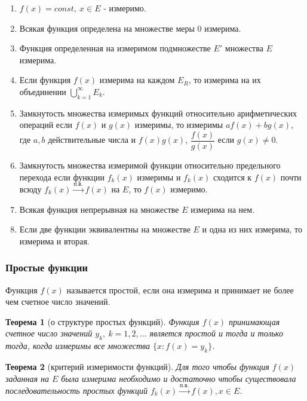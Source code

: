 \documentclass[14pt,a4paper]{extarticle}
\newtheorem{theorem}{Теорема}[section]
\theoremstyle{definition}
\theoremstyle{remark}
\renewcommand{\[}{\begin{dmath*}[compact]}
\renewcommand{\]}{\end{dmath*}}
\newcommand{\be}{\begin{enumerate}}
\newcommand{\ee}{\end{enumerate}}
\newcommand{\ds}{\displaystyle}
\newcommand{\sep}{ , \ \allowbreak }
\newcommand\fr[2]{\dfrac{#1}{#2}}
\begin{document}
\be
  \item $f(x)=const \sep x \in E$ - измеримо.

  \item Всякая функция определена на множестве меры 0 измерима.

  \item Функция определенная на измеримом подмножестве $E'$ множества
  $E$ измерима.

  \item Если функция $f(x)$ измерима на каждом $E_R$, то измерима на их
  объединении $\ds\bigcup _ {k=1}^\infty E_k$.

  \item Замкнутость множества измеримых функций относительно арифметических
  операций если $f(x)$ и $g(x)$ измеримы, то измеримы $af(x)+ bg(x)$, где $a,b$
  действительные числа и $f(x)g(x)$, $\fr{f(x)}{g(x)}$ если $g(x) \neq 0$.

  \item Замкнутость множества измеримой функции относительно предельного
  перехода если функции $f_k(x)$ измеримы и $f_k(x)$ сходится к $f(x)$
  почти всюду $f_k(x) \xrightarrow{\text{п.в.}} f(x)$ на $E$,
  то $f(x)$ измеримо.

  \item Всякая функция непрерывная на множестве $E$ измерима на нем.

  \item Если две функции эквивалентны на множестве $E$ и одна из них измерима,
  то измерима и вторая.
\ee

\subsubsection{Простые функции}

Функция $f(x)$ называется простой, если она измерима и принимает
не более чем счетное число значений.

\begin{theorem}[о структуре простых функций]
  Функция $f(x)$ принимающая счетное число значений $y_k\sep k=1,2,\dots$
  является простой и тогда и только тогда,
  когда измеримы все множества $\{x: f(x) = y_k \}$.
\end{theorem}

\begin{theorem}[критерий измеримости функций]
  Для того чтобы функция $f(x)$ заданная на $E$ была измерима
  необходимо и достаточно чтобы существовала последовательность
  простых функций $f_k (x) \xrightarrow{\text{п.в.}} f(x), x \in E$.
\end{theorem}
\end{document}
